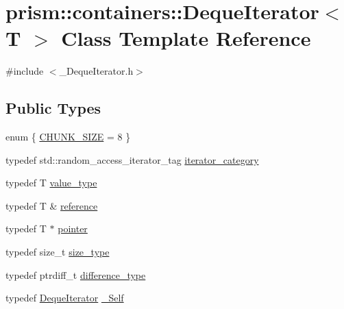 \hypertarget{classprism_1_1containers_1_1_deque_iterator}{}\section{prism\+:\+:containers\+:\+:Deque\+Iterator$<$ T $>$ Class Template Reference}
\label{classprism_1_1containers_1_1_deque_iterator}


{\ttfamily \#include $<$\+\_\+\+Deque\+Iterator.\+h$>$}

\subsection*{Public Types}
\begin{DoxyCompactItemize}
\item 
enum \{ \hyperlink{classprism_1_1containers_1_1_deque_iterator_a8d329a4cffd98b8e54cb549d11790596a67b1ecf27d74afe920e8b0d01953df39}{C\+H\+U\+N\+K\+\_\+\+S\+I\+ZE} = 8
 \}
\item 
typedef std\+::random\+\_\+access\+\_\+iterator\+\_\+tag \hyperlink{classprism_1_1containers_1_1_deque_iterator_ada6e48b4bf97d304a24d65c1ec7df374}{iterator\+\_\+category}
\item 
typedef T \hyperlink{classprism_1_1containers_1_1_deque_iterator_ac1b7df42a33124023e6251c457fb0f08}{value\+\_\+type}
\item 
typedef T \& \hyperlink{classprism_1_1containers_1_1_deque_iterator_a72100e9ee4840ecadaa96245732147d2}{reference}
\item 
typedef T $\ast$ \hyperlink{classprism_1_1containers_1_1_deque_iterator_ab8852d168fc77cd5368dca9ab14e456a}{pointer}
\item 
typedef size\+\_\+t \hyperlink{classprism_1_1containers_1_1_deque_iterator_ab0c68bd1da836f6372247f4ba053e2ac}{size\+\_\+type}
\item 
typedef ptrdiff\+\_\+t \hyperlink{classprism_1_1containers_1_1_deque_iterator_a03df377d025d668229049bc0f696d291}{difference\+\_\+type}
\item 
typedef \hyperlink{classprism_1_1containers_1_1_deque_iterator}{Deque\+Iterator} \hyperlink{classprism_1_1containers_1_1_deque_iterator_ad27f6d3d6d64495652855cd194f624fc}{\+\_\+\+Self}
\end{DoxyCompactItemize}
